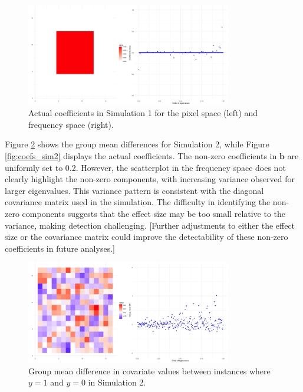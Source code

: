 \documentclass[12pt]{article}
\begin{document}
\begin{figure}[H]
	\centering
	\includegraphics[width=0.8\textwidth, height=0.35\textwidth]{actual_coefs_sim1.png}
	\caption{Actual coefficients in Simulation 1 for the pixel space (left) and frequency space (right).}
	\label{fig:coefs_sim1}
\end{figure}

Figure \ref{fig:group_diff2} shows the group mean differences for Simulation 2, while Figure \ref{fig:coefs_sim2} displays the actual coefficients. The non-zero coefficients in \( \mathbf{b} \) are uniformly set to 0.2. However, the scatterplot in the frequency space does not clearly highlight the non-zero components, with increasing variance observed for larger eigenvalues. This variance pattern is consistent with the diagonal covariance matrix used in the simulation. The difficulty in identifying the non-zero components suggests that the effect size may be too small relative to the variance, making detection challenging. [Further adjustments to either the effect size or the covariance matrix could improve the detectability of these non-zero coefficients in future analyses.]

\begin{figure}[H]
	\centering
	\includegraphics[width=0.8\textwidth, height=0.35\textwidth]{group_mean_diff_sim2.png}
	\caption{Group mean difference in covariate values between instances where \( y = 1 \) and \( y = 0 \) in Simulation 2.}
	\label{fig:group_diff2}
\end{figure}
\end{document}
